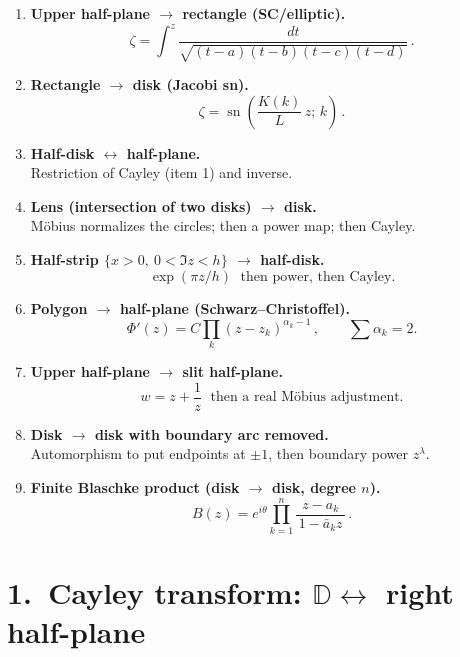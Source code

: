 \documentclass[12pt,a4paper]{article}
\begin{document}
\begin{enumerate}
		\item \textbf{Upper half-plane $\to$ rectangle (SC/elliptic).}\\[2pt]
		\[
		\boxed{\,\zeta=\int^z \frac{dt}{\sqrt{(t-a)(t-b)(t-c)(t-d)}}\,}.
		\]
		
		\item \textbf{Rectangle $\to$ disk (Jacobi sn).}\\[2pt]
		\[
		\boxed{\,\zeta=\operatorname{sn}\!\left(\frac{K(k)}{L}\,z;\,k\right)\,}.
		\]
		
		\item \textbf{Half-disk $\leftrightarrow$ half-plane.}\\[2pt]
		Restriction of Cayley (item 1) and inverse.
		
		\item \textbf{Lens (intersection of two disks) $\to$ disk.}\\[2pt]
		Möbius normalizes the circles; then a power map; then Cayley.
		
		\item \textbf{Half-strip $\{x>0,\ 0<\Im z<h\}$ $\to$ half-disk.}\\[2pt]
		\[
		\boxed{\,\exp(\pi z/h)\,}\ \ \text{then power, then Cayley}.
		\]
		
		\item \textbf{Polygon $\to$ half-plane (Schwarz--Christoffel).}\\[2pt]
		\[
		\boxed{\,\Phi'(z)=C\prod_k (z-z_k)^{\alpha_k-1}\,},\qquad \sum\alpha_k=2.
		\]
		
		\item \textbf{Upper half-plane $\to$ slit half-plane.}\\[2pt]
		\[
		\boxed{\,w=z+\frac{1}{z}\,}\ \ \text{then a real Möbius adjustment}.
		\]
		
		\item \textbf{Disk $\to$ disk with boundary arc removed.}\\[2pt]
		Automorphism to put endpoints at $\pm1$, then boundary power $z^\lambda$.
		
		\item \textbf{Finite Blaschke product (disk $\to$ disk, degree $n$).}\\[2pt]
		\[
		\boxed{\,B(z)=e^{i\theta}\prod_{k=1}^n \frac{z-a_k}{\,1-\bar a_k z\,}\,}.
		\]
	\end{enumerate}
	
	
	
	
	\section*{1.\ Cayley transform: $\mathbb D \leftrightarrow$ right half-plane}
	
\end{document}

